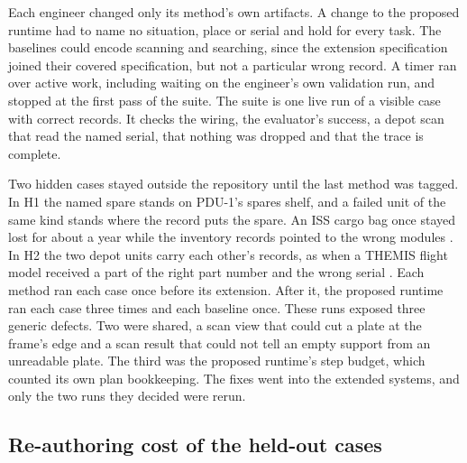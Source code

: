 Each engineer changed only its method's own artifacts. A change to the proposed runtime had to name no situation, place
or serial and hold for every task. The baselines could encode scanning and searching, since the extension specification
joined their covered specification, but not a particular wrong record. A timer ran over active work, including waiting
on the engineer's own validation run, and stopped at the first pass of the suite. The suite is one live run of a visible
case with correct records. It checks the wiring, the evaluator's success, a depot scan that read the named serial, that
nothing was dropped and that the trace is complete.

Two hidden cases stayed outside the repository until the last method was tagged. In H1 the named spare stands on
PDU-1's spares shelf, and a failed unit of the same kind stands where the record puts the spare. An ISS cargo bag once
stayed lost for about a year while the inventory records pointed to the wrong modules \citep{berger2021rfid}. In H2 the
two depot units carry each other's records, as when a THEMIS flight model received a part of the right part number and
the wrong serial \citep{themis2007pfr196}. Each method ran each case once before its extension. After it, the proposed
runtime ran each case three times and each baseline once. These runs exposed three generic defects. Two were shared,
a scan view that could cut a plate at the frame's edge and a scan result that could not tell an empty support from an
unreadable plate. The third was the proposed runtime's step budget, which counted its own plan bookkeeping. The fixes
went into the extended systems, and only the two runs they decided were rerun.

\subsection{Re-authoring cost of the held-out cases}
\label{sec:setup-reauthoring}

